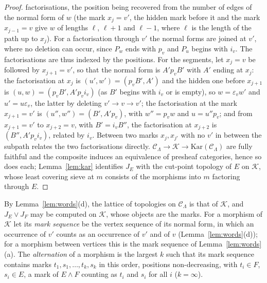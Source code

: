 \documentclass[11pt]{amsart}
\theoremstyle{definition}
\begin{document}
\begin{proof}
factorisations, the position being recovered from the number of edges
of the normal form of $w$ (the mark $x_j=v'$, the hidden mark before it
and the mark $x_{j-1}=v$ give $w$ of lengths $\ell$, $\ell+1$ and
$\ell-1$, where $\ell$ is the length of the path up to $x_j$). For a factorisation
through $v'$ the normal forms are joined at $v'$, where no deletion can
occur, since $P_w$ ends with $p_v$ and $P_u$ begins with $i_v$. The
factorisations are thus indexed by the positions. For the segments, let
$x_j=v$ be followed by $x_{j+1}=v'$, so that the normal form is
$A'p_vB'$ with $A'$ ending at $x_j$: the factorisation at $x_j$ is
$(u',w')=(p_vB',A')$ and the hidden one before $x_{j+1}$ is
$(u,w)=(p_vB',A'p_vi_v)$ (as $B'$ begins with $i_v$ or is empty), so
$w=\varepsilon_vw'$ and $u'=u\varepsilon_v$, the latter by deleting
$v'\to v\to v'$; the factorisation at the mark $x_{j+1}=v'$ is
$(u'',w'')=(B',A'p_v)$, with $w''=p_vw$ and $u=u''p_v$; and from
$x_{j+1}=v'$ to $x_{j+2}=v$, with $B'=i_vB''$, the factorisation at
$x_{j+2}$ is $(B'',A'p_vi_v)$, related by $i_v$. Between two marks
$x_j,x_{j'}$ with no $v'$ in between the subpath relates the two
factorisations directly.
$\mathcal C_\Lambda\to\mathcal K\to\mathrm{Kar}(\mathcal C_\Lambda)$ are
fully faithful and the composite induces an equivalence of presheaf
categories, hence so does each; Lemma~\ref{lem:kar} identifies $J_E$ with
the cut-point topology of $E$ on $\mathcal K$, whose least covering sieve
at $m$ consists of the morphisms into $m$ factoring through $E$.
\end{proof}

By Lemma~\ref{lem:words}(d), the lattice of topologies on $\mathcal
C_\Lambda$ is that of $\mathcal K$, and $J_E\vee J_F$ may be computed on
$\mathcal K$, whose objects are the marks. For a morphism of $\mathcal K$ let its
\emph{mark sequence} be the vertex sequence of its normal form, in which
an occurrence of $v'$ counts as an occurrence of $v'$ and of $v$
(Lemma~\ref{lem:words}(d)); for a morphism between vertices this is the
mark sequence of Lemma~\ref{lem:words}(a). The \emph{alternation} of a
morphism is the largest $k$ such that its mark sequence contains marks
$t_1,s_1,\dots,t_k,s_k$ in this order, positions non-decreasing, with
$t_i\in F$, $s_i\in E$, a mark of $E\wedge F$ counting as $t_i$ and
$s_i$ for all $i$ ($k=\infty$).
\end{document}
